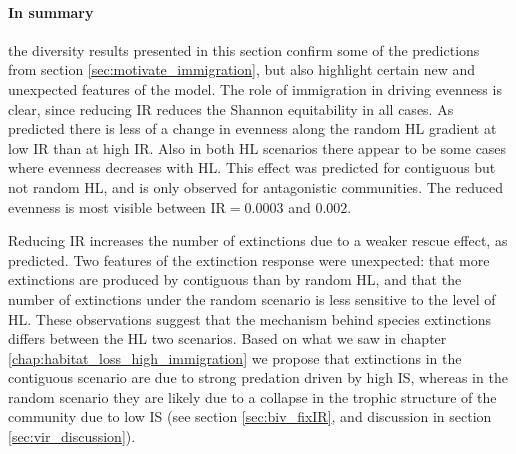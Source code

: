 
\paragraph*{In summary} the diversity results presented in this section confirm some of the predictions from section \ref{sec:motivate_immigration}, but also highlight certain new and unexpected features of the model. The role of immigration in driving evenness is clear, since reducing IR reduces the Shannon equitability in all cases. As predicted there is less of a change in evenness along the random HL gradient at low IR than at high IR. Also in both HL scenarios there appear to be some cases where evenness decreases with HL. This effect was predicted for contiguous but not random HL, and is only observed for antagonistic communities. The reduced evenness is most visible between IR$ =0.0003$ and $0.002$.

Reducing IR increases the number of extinctions due to a weaker rescue effect, as predicted. Two features of the extinction response were unexpected: that more extinctions are produced by contiguous than by random HL, and that the number of extinctions under the random scenario is less sensitive to the level of HL. These observations suggest that the mechanism behind species extinctions differs between the HL two scenarios. Based on what we saw in chapter \ref{chap:habitat_loss_high_immigration} we propose that extinctions in the contiguous scenario are due to strong predation driven by high IS, whereas in the random scenario they are likely due to a collapse in the trophic structure of the community due to low IS (see section \ref{sec:biv_fixIR}, and discussion in section \ref{sec:vir_discussion}).

